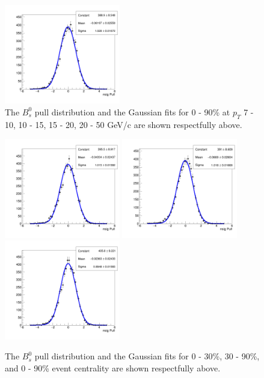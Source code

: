 \begin{figure}[h]
\begin{center}
\includegraphics[width= 0.45\textwidth]{Figures/Chapter5/pull_signal_BptNew_0_90_20_50_0_Bs.png}
\caption{The $B^0_s$ pull distribution and the Gaussian fits for 0 - 90\% at $p_T$ 7 - 10, 10 - 15, 15 - 20, 20 - 50 GeV/c are shown respectfully above.} 
\label{BsPtPull} 
\end{center}
\end{figure}

\begin{figure}[h]
\begin{center}
\includegraphics[width= 0.45\textwidth]{Figures/Chapter5/pull_signal_BptNew_0_30_10_50_0_Bs.png}
\includegraphics[width= 0.45\textwidth]{Figures/Chapter5/pull_signal_BptNew_30_90_10_50_0_Bs.png}
\includegraphics[width= 0.45\textwidth]{Figures/Chapter5/pull_signal_BptNew_0_90_10_50_0_Bs.png}
\caption{The $B^0_s$ pull distribution and the Gaussian fits for 0 - 30\%, 30 - 90\%, and 0 - 90\% event centrality are shown respectfully above.} 
\label{BsCentPull} 
\end{center}
\end{figure}


